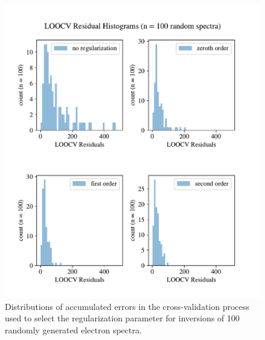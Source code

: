\begin{figure}[p]
    \centering
    \includegraphics[width=\textwidth]{figures/chapter_4/loocv_histograms/loocv_histograms.pdf}
    \caption{Distributions of accumulated errors in the cross-validation process used to select the regularization parameter for inversions of 100 randomly generated electron spectra.}
    \label{why_non_negative_is_good}
\end{figure}
